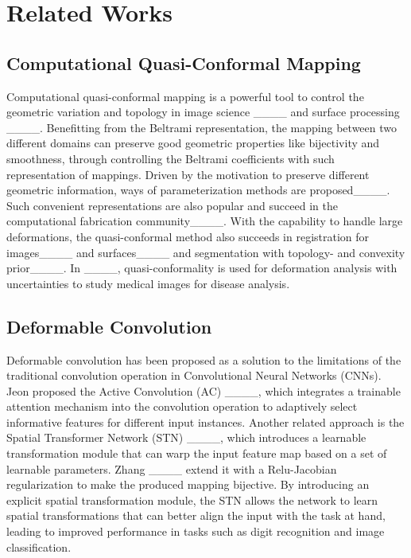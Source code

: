 \section{Related Works}
\subsection{Computational Quasi-Conformal Mapping}
Computational quasi-conformal mapping is a powerful tool to control the geometric variation and topology in image science ____ and surface processing ____. Benefitting from the Beltrami representation, the mapping between two different domains can preserve good geometric properties like bijectivity and smoothness, through controlling the Beltrami coefficients with such representation of mappings. Driven by the motivation to preserve different geometric information, ways of parameterization methods are proposed____. Such convenient representations are also popular and succeed in the computational fabrication community____. With the capability to handle large deformations, the quasi-conformal method also succeeds in registration for images____ and surfaces____ and segmentation with topology- and convexity prior____. In ____, quasi-conformality is used for deformation analysis with uncertainties to study medical images for disease analysis. 


\subsection{Deformable Convolution}

Deformable convolution has been proposed as a solution to the limitations of the traditional convolution operation in Convolutional Neural Networks (CNNs). Jeon \etal proposed the Active Convolution (AC) ____, which integrates a trainable attention mechanism into the convolution operation to adaptively select informative features for different input instances. Another related approach is the Spatial Transformer Network (STN) ____, which introduces a learnable transformation module that can warp the input feature map based on a set of learnable parameters. Zhang \etal ____ extend it with a Relu-Jacobian regularization to make the produced mapping bijective. By introducing an explicit spatial transformation module, the STN allows the network to learn spatial transformations that can better align the input with the task at hand, leading to improved performance in tasks such as digit recognition and image classification. 

